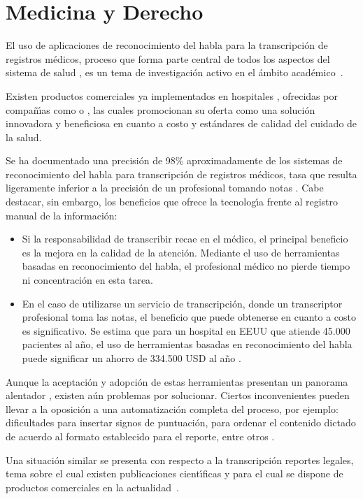 \section{Medicina y Derecho}
\label{sec:medicina}

El uso de aplicaciones de reconocimiento del habla para la transcripci\'on de registros m\'edicos, proceso 
que forma parte central de todos los aspectos del sistema de salud \cite{DavidListening2009}, 
es un tema de investigaci\'on activo en el \'ambito 
\mbox{acad\'emico \cite{LaiMedSpeak1997, HappeCombining2002}}.

Existen productos comerciales ya implementados en hospitales \cite{USATodayHospitals},
ofrecidas por compa\~n{\'\i}as como  \cite{NuanceOptimizing, NuanceSpeech} 
o  \cite{MmodalSpeech}, las cuales promocionan su oferta 
como una soluci\'on innovadora y beneficiosa en cuanto a costo y est\'andares de calidad del cuidado de la salud.

Se ha documentado una precisi\'on de 98\% aproximadamente de los sistemas de reconocimiento del habla para 
transcripci\'on de registros m\'edicos, tasa que resulta ligeramente inferior a la precisi\'on de un 
profesional tomando notas \cite{ZickVoice2001}. Cabe destacar, sin embargo, los beneficios que ofrece 
la tecnolog{\'\i}a frente al registro manual de la \mbox{informaci\'on}:

\begin{itemize}
	\item Si la responsabilidad de transcribir recae en el m\'edico, el principal beneficio es la mejora en 
	la calidad de la atenci\'on.
	Mediante el uso de herramientas basadas en reconocimiento del habla, el profesional m\'edico no pierde 
	tiempo ni concentraci\'on en esta tarea.
	\item En el caso de utilizarse un servicio de transcripci\'on, donde un transcriptor profesional toma las notas,
	el beneficio que puede obtenerse en cuanto a costo es significativo. Se estima que para un 
	hospital en EEUU que atiende 45.000 pacientes al a\~no, el uso de herramientas basadas en reconocimiento 
    del habla puede significar un ahorro de 334.500 USD al a\~no \cite{ZickVoice2001}.
\end{itemize}

Aunque la aceptaci\'on y adopci\'on de estas herramientas presentan un panorama alentador \cite{GrassoLong2003}, 
existen a\'un problemas por solucionar. Ciertos inconvenientes pueden llevar a 
la oposici\'on a una automatizaci\'on completa del proceso, por ejemplo: dificultades para insertar 
signos de puntuaci\'on, para ordenar el contenido dictado de acuerdo al formato establecido para el reporte,
entre otros \cite{DavidListening2009}.

Una situaci\'on similar se presenta con respecto a la transcripci\'on reportes legales, 
tema sobre el cual existen publicaciones cient{\'\i}ficas \cite{van-leeuwen2008improving, FalavignaAutomatic2009} 
y para el cual se dispone de productos comerciales en la \mbox{actualidad \cite{NuanceLegal}}.
